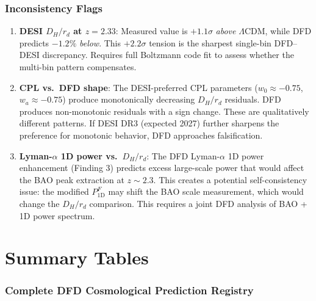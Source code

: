 \documentclass[11pt,a4paper]{article}
\newcommand{\LCDM}{$\Lambda$CDM}
\begin{document}
\section{Inconsistency Flags}

\begin{enumerate}
\item \textbf{DESI $D_H/r_d$ at $z = 2.33$}: Measured value is
  $+1.1\sigma$ \emph{above} \LCDM, while DFD predicts $-1.2\%$
  \emph{below}. This $+2.2\sigma$ tension is the sharpest single-bin
  DFD--DESI discrepancy. Requires full Boltzmann code fit to assess
  whether the multi-bin pattern compensates.

\item \textbf{CPL vs.\ DFD shape}: The DESI-preferred CPL parameters
  ($w_0 \approx -0.75$, $w_a \approx -0.75$) produce monotonically
  decreasing $D_H/r_d$ residuals. DFD produces non-monotonic residuals
  with a sign change. These are qualitatively different patterns.
  If DESI DR3 (expected 2027) further sharpens the preference for
  monotonic behavior, DFD approaches falsification.

\item \textbf{Lyman-$\alpha$ 1D power vs.\ $D_H/r_d$}: The DFD
  Lyman-$\alpha$ 1D power enhancement (Finding 3) predicts excess
  large-scale power that would affect the BAO peak extraction at
  $z \sim 2.3$. This creates a potential self-consistency issue:
  the modified $P_{1\text{D}}^F$ may shift the BAO scale measurement,
  which would change the $D_H/r_d$ comparison. This requires a
  joint DFD analysis of BAO + 1D power spectrum.
\end{enumerate}


\part{Summary Tables}

\section{Complete DFD Cosmological Prediction Registry}
\end{document}
